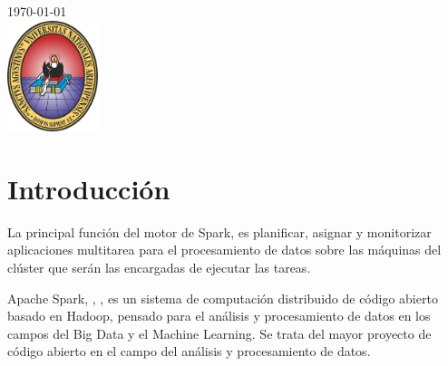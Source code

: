 \documentclass{article}
\begin{document}
\begin{titlepage}
	
	
	{\large \today}\\[2cm] %
	
	
	\includegraphics[width=100px, keepaspectratio]{img/unsa}\\[1cm] %
	
	
	\vfill %
	
\end{titlepage}	
	
	
	

	
	
\tableofcontents
\newpage	
	

	
		
	
\section{Introducción}

La principal función del motor de Spark, \cite{apacheSpark} es planificar, asignar y monitorizar aplicaciones multitarea para el procesamiento de datos sobre las máquinas del clúster que serán las encargadas de ejecutar las tareas. 

Apache Spark, \cite{ApacheBigData}, \cite{spark2018apache}, \cite{spark2010spark} es un sistema de computación distribuido de código abierto basado en Hadoop, pensado para el análisis y procesamiento de datos en los campos del Big Data y el Machine Learning. Se trata del mayor proyecto de código abierto en el campo del análisis y procesamiento de datos. 
\end{document}
